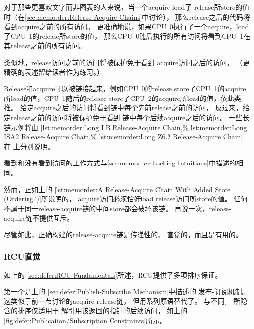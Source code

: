 对于那些更喜欢文字而非图表的人来说，当一个acquire load了
release所store的值时（在\cref{sec:memorder:Release-Acquire Chains}中讨论），
那么release之后的代码将看到acquire之前的所有访问。
更准确地说，如果CPU~0执行了一个acquire，load了CPU~1的release所store的值，
那么CPU~0随后执行的所有访问将看到CPU~1在其release之前的所有访问。

类似地，release访问之前的访问将被保护免于看到
acquire访问之后的访问。
（更精确的表述留给读者作为练习。）

Release和acquire可以被链接起来，例如CPU~0的release
store了CPU~1的acquire所load的值，CPU~1随后的release
store了CPU~2的acquire所load的值，依此类推。
给定acquire之后的访问将看到链中每个先前release之前的访问，
反过来，给定release之前的访问将被保护免于看到
链中每个后续acquire之后的访问。
一些长链示例将由
\cref{lst:memorder:Long LB Release-Acquire Chain,%
lst:memorder:Long ISA2 Release-Acquire Chain,%
lst:memorder:Long Z6.2 Release-Acquire Chain}
在
上分别说明。

看到和没有看到访问的工作方式与\cref{sec:memorder:Locking Intuitions}中描述的相同。

然而，正如上的
\cref{lst:memorder:A Release-Acquire Chain With Added Store (Ordering?)}所说明的，
acquire访问必须恰好load release访问所store的值。
任何不属于同一release-acquire链的中间store都会破坏该链。
再说一次，release-acquire链不提供互斥。

尽管如此，正确构建的release-acquire链是传递性的、
直觉的，而且是有用的。

\subsubsection{RCU直觉}
\label{sec:memorder:RCU Intuitions}

如上的
\cref{sec:defer:RCU Fundamentals}所述，RCU提供了多项排序保证。

第一个是上的
\cref{sec:defer:Publish-Subscribe Mechanism}中描述的
发布-订阅机制。
这类似于前一节讨论的acquire-release链，
但用系列原语替代了。
与不同，
所隐含的排序仅适用于
解引用该返回的指针的后续访问，
如上的
\cref{fig:defer:Publication/Subscription Constraints}所示。

